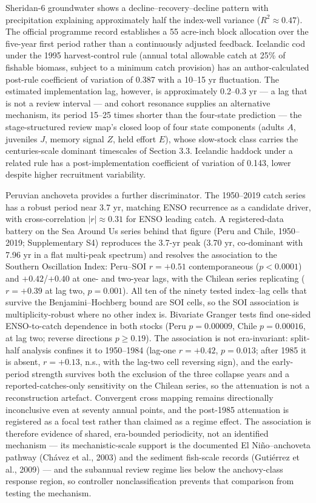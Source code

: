 \documentclass[11pt]{article}
\begin{document}
Sheridan-6 groundwater shows a decline--recovery--decline pattern with
precipitation explaining approximately half the index-well variance
(\(R^2\approx0.47\)). The official programme record establishes a 55
acre-inch block allocation over the five-year first period rather than a
continuously adjusted feedback. Icelandic cod under the 1995
harvest-control rule (annual total allowable catch at 25\% of fishable
biomass, subject to a minimum catch provision) has an author-calculated
post-rule coefficient of variation of 0.387 with a 10--15 yr
fluctuation. The estimated implementation lag, however, is approximately
0.2--0.3 yr --- a lag that is not a review interval --- and cohort
resonance supplies an alternative mechanism, its period 15--25 times
shorter than the four-state prediction --- the stage-structured review
map's closed loop of four state components (adults \(A\), juveniles
\(J\), memory signal \(Z\), held effort \(E\)), whose slow-stock class
carries the centuries-scale dominant timescales of Section 3.3.
Icelandic haddock under a related rule has a post-implementation
coefficient of variation of 0.143, lower despite higher recruitment
variability.

Peruvian anchoveta provides a further discriminator. The 1950--2019
catch series has a robust period near 3.7 yr, matching ENSO recurrence
as a candidate driver, with cross-correlation \(|r|\approx0.31\) for
ENSO leading catch. A registered-data battery on the Sea Around Us
series behind that figure (Peru and Chile, 1950--2019; Supplementary S4)
reproduces the 3.7-yr peak (3.70 yr, co-dominant with 7.96 yr in a flat
multi-peak spectrum) and resolves the association to the Southern
Oscillation Index: Peru--SOI \(r=+0.51\) contemporaneous (\(p<0.0001\))
and \(+0.42\)/\(+0.40\) at one- and two-year lags, with the Chilean
series replicating (\(r=+0.39\) at lag two, \(p=0.001\)). All ten of the
ninety tested index--lag cells that survive the Benjamini--Hochberg
bound are SOI cells, so the SOI association is multiplicity-robust where
no other index is. Bivariate Granger tests find one-sided ENSO-to-catch
dependence in both stocks (Peru \(p=0.00009\), Chile \(p=0.00016\), at
lag two; reverse directions \(p\ge0.19\)). The association is not
era-invariant: split-half analysis confines it to 1950--1984 (lag-one
\(r=+0.42\), \(p=0.013\); after 1985 it is absent, \(r=+0.13\), n.s.,
with the lag-two cell reversing sign), and the early-period strength
survives both the exclusion of the three collapse years and a
reported-catches-only sensitivity on the Chilean series, so the
attenuation is not a reconstruction artefact. Convergent cross mapping
remains directionally inconclusive even at seventy annual points, and
the post-1985 attenuation is registered as a focal test rather than
claimed as a regime effect. The association is therefore evidence of
shared, era-bounded periodicity, not an identified mechanism --- its
mechanistic-scale support is the documented El Ni\~no--anchoveta pathway
(Ch\'avez et al., 2003) and the sediment fish-scale records (Guti\'errez et
al., 2009) --- and the subannual review regime lies below the
anchovy-class response region, so controller nonclassification prevents
that comparison from testing the mechanism.
\end{document}
